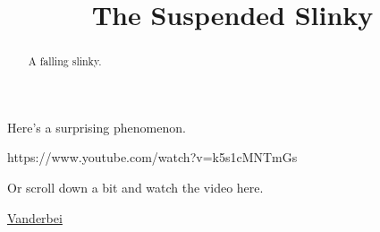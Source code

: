 \documentclass{ximera}
\title{The Suspended Slinky}
\begin{document}
\begin{abstract}
A falling slinky.
\end{abstract}
\maketitle

Here's a surprising phenomenon.

\begin{center}  
\end{center}


https://www.youtube.com/watch?v=k5s1cMNTmGs



Or scroll down a bit and watch the video here.

\href{dsffdhttps://vanderbei.princeton.edu/WebGL/Slinky.html}{Vanderbei}
\end{document}
